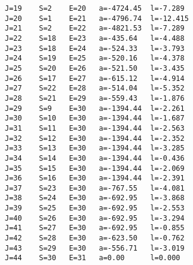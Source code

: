 \begin{verbatim}
J=19    S=2    E=20   a=-4724.45  l=-7.289  
J=20    S=1    E=21   a=-4796.74  l=-12.415 
J=21    S=2    E=22   a=-4821.53  l=-7.289  
J=22    S=18   E=23   a=-435.64   l=-4.488  
J=23    S=18   E=24   a=-524.33   l=-3.793  
J=24    S=19   E=25   a=-520.16   l=-4.378  
J=25    S=20   E=26   a=-521.50   l=-3.435  
J=26    S=17   E=27   a=-615.12   l=-4.914  
J=27    S=22   E=28   a=-514.04   l=-5.352  
J=28    S=21   E=29   a=-559.43   l=-1.876  
J=29    S=9    E=30   a=-1394.44  l=-2.261  
J=30    S=10   E=30   a=-1394.44  l=-1.687  
J=31    S=11   E=30   a=-1394.44  l=-2.563  
J=32    S=12   E=30   a=-1394.44  l=-2.352  
J=33    S=13   E=30   a=-1394.44  l=-3.285  
J=34    S=14   E=30   a=-1394.44  l=-0.436  
J=35    S=15   E=30   a=-1394.44  l=-2.069  
J=36    S=16   E=30   a=-1394.44  l=-2.391  
J=37    S=23   E=30   a=-767.55   l=-4.081  
J=38    S=24   E=30   a=-692.95   l=-3.868  
J=39    S=25   E=30   a=-692.95   l=-2.553  
J=40    S=26   E=30   a=-692.95   l=-3.294  
J=41    S=27   E=30   a=-692.95   l=-0.855  
J=42    S=28   E=30   a=-623.50   l=-0.762  
J=43    S=29   E=30   a=-556.71   l=-3.019  
J=44    S=30   E=31   a=0.00      l=0.000   
\end{verbatim}


